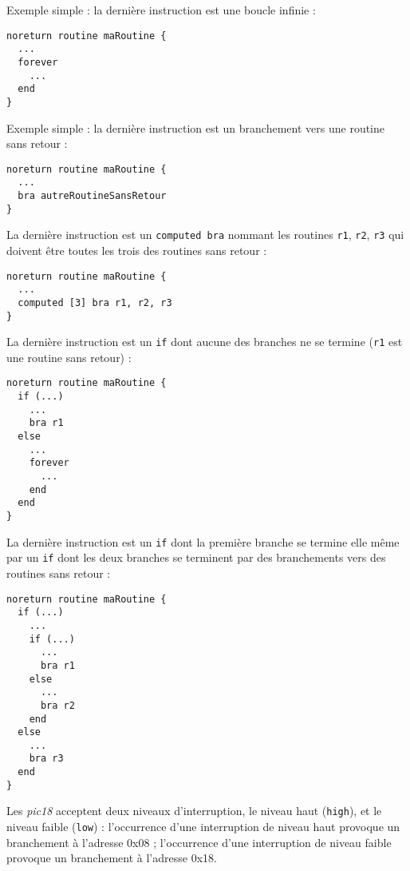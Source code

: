 Exemple simple : la dernière instruction est une boucle infinie :
\begin{lstlisting}[language=piccolo]
noreturn routine maRoutine {
  ...
  forever
    ...
  end
}
\end{lstlisting}

Exemple simple : la dernière instruction est un branchement vers une routine sans retour :
\begin{lstlisting}[language=piccolo]
noreturn routine maRoutine {
  ...
  bra autreRoutineSansRetour
}
\end{lstlisting}

La dernière instruction est un \texttt{computed bra} nommant les routines \texttt{r1}, \texttt{r2}, \texttt{r3} qui doivent être toutes les trois des routines sans retour :
\begin{lstlisting}[language=piccolo]
noreturn routine maRoutine {
  ...
  computed [3] bra r1, r2, r3
}
\end{lstlisting}

La dernière instruction est un \texttt{if} dont aucune des branches ne se termine (\texttt{r1} est une routine sans retour) :
\begin{lstlisting}[language=piccolo]
noreturn routine maRoutine {
  if (...)
    ...
    bra r1
  else
    ...
    forever
      ...
    end
  end
}

\end{lstlisting}


La dernière instruction est un \texttt{if} dont la première branche se termine elle même par un \texttt{if} dont les deux branches se terminent par des branchements vers des routines sans retour :
\begin{lstlisting}[language=piccolo]
noreturn routine maRoutine {
  if (...)
    ...
    if (...)
      ...
      bra r1
    else
      ...
      bra r2
    end
  else
    ...
    bra r3
  end
}
\end{lstlisting}









Les \emph{pic18} acceptent deux niveaux d’interruption, le niveau haut (\texttt{high}), et le niveau faible (\texttt{low}) :
l’occurrence d’une interruption de niveau haut provoque un branchement à l’adresse 0x08 ;
l’occurrence d’une interruption de niveau faible provoque un branchement à l’adresse 0x18.

